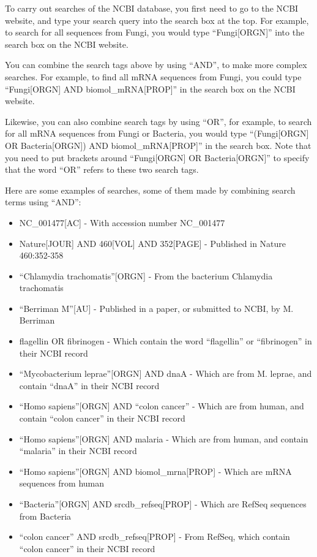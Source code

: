 \documentclass[
]{book}
\providecommand{\tightlist}{%
  \setlength{\itemsep}{0pt}\setlength{\parskip}{0pt}}
\begin{document}
To carry out searches of the NCBI database, you first need to go to the NCBI website, and type your search query into the search box at the top. For example, to search for all sequences from Fungi, you would type ``Fungi{[}ORGN{]}'' into the search box on the NCBI website.

You can combine the search tags above by using ``AND'', to make more complex searches. For example, to find all mRNA sequences from Fungi, you could type ``Fungi{[}ORGN{]} AND biomol\_mRNA{[}PROP{]}'' in the search box on the NCBI website.

Likewise, you can also combine search tags by using ``OR'', for example, to search for all mRNA sequences from Fungi or Bacteria, you would type ``(Fungi{[}ORGN{]} OR Bacteria{[}ORGN{]}) AND biomol\_mRNA{[}PROP{]}'' in the search box. Note that you need to put brackets around ``Fungi{[}ORGN{]} OR Bacteria{[}ORGN{]}'' to specify that the word ``OR'' refers to these two search tags.

Here are some examples of searches, some of them made by combining search terms using ``AND'':

\begin{itemize}
\tightlist
\item
  NC\_001477{[}AC{]} - With accession number NC\_001477
\item
  Nature{[}JOUR{]} AND 460{[}VOL{]} AND 352{[}PAGE{]} - Published in Nature 460:352-358
\item
  ``Chlamydia trachomatis''{[}ORGN{]} - From the bacterium Chlamydia trachomatis
\item
  ``Berriman M''{[}AU{]} - Published in a paper, or submitted to NCBI, by M. Berriman
\item
  flagellin OR fibrinogen - Which contain the word ``flagellin'' or ``fibrinogen'' in their NCBI record
\item
  ``Mycobacterium leprae''{[}ORGN{]} AND dnaA - Which are from M. leprae, and contain ``dnaA'' in their NCBI record
\item
  ``Homo sapiens''{[}ORGN{]} AND ``colon cancer'' - Which are from human, and contain ``colon cancer'' in their NCBI record
\item
  ``Homo sapiens''{[}ORGN{]} AND malaria - Which are from human, and contain ``malaria'' in their NCBI record
\item
  ``Homo sapiens''{[}ORGN{]} AND biomol\_mrna{[}PROP{]} - Which are mRNA sequences from human
\item
  ``Bacteria''{[}ORGN{]} AND srcdb\_refseq{[}PROP{]} - Which are RefSeq sequences from Bacteria
\item
  ``colon cancer'' AND srcdb\_refseq{[}PROP{]} - From RefSeq, which contain ``colon cancer'' in their NCBI record
\end{itemize}
\end{document}
